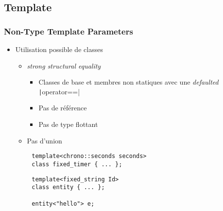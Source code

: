 \documentclass[C++.tex]{subfiles}
\begin{document}
\subsection*{Template}
\begin{frame}[fragile]
	\frametitle{Non-Type Template Parameters}
	\begin{itemize}
		\item Utilisation possible de classes
		\begin{itemize}
			\item \textit{strong structural equality}
			\begin{itemize}
				\item Classes de base et membres non statiques avec une \textit{defaulted} \texttt|operator==|
				\item Pas de référence
				\item Pas de type flottant
			\end{itemize}
			\item Pas d'union
		\end{itemize}
	\end{itemize}

	\begin{verbatim}
		template<chrono::seconds seconds>
		class fixed_timer { ... };
	\end{verbatim}


	\begin{verbatim}
		template<fixed_string Id>
		class entity { ... };

		entity<"hello"> e;
	\end{verbatim}


\end{frame}
\end{document}

